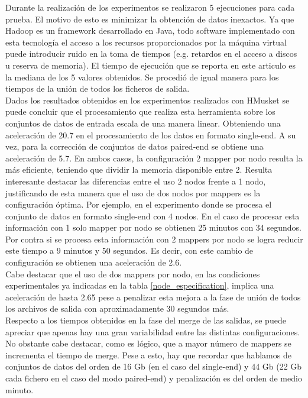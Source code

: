 \documentclass[conference]{IEEEtran}
\begin{document}
Durante la realización de los experimentos se realizaron 5 ejecuciones para cada prueba. El motivo de esto es minimizar la obtención de datos inexactos. Ya que Hadoop es un framework desarrollado en Java, todo software implementado con esta tecnología el acceso a los recursos proporcionados por la máquina virtual puede introducir ruido en la toma de tiempos (e.g. retardos en el acceso a discos u reserva de memoria). El tiempo de ejecución que se reporta en este articulo es la mediana de los 5 valores obtenidos. Se procedió de igual manera para los tiempos de la unión de todos los ficheros de salida.\\

Dados los resultados obtenidos en los experimentos realizados con HMusket se puede concluir que el procesamiento que realiza esta herramienta sobre los conjuntos de datos de entrada escala de una manera linear. Obteniendo una aceleración de 20.7 en el procesamiento de los datos en formato single-end. A su vez, para la corrección de conjuntos de datos paired-end se obtiene una aceleración de 5.7. En ambos casos, la configuración 2 mapper por nodo resulta la más eficiente, teniendo que dividir la memoria disponible entre 2. Resulta interesante destacar las diferencias entre el uso 2 nodos frente a 1 nodo, justificando de esta manera que el uso de dos nodos por mappers es la configuración óptima. Por ejemplo, en el experimento donde se procesa el conjunto de datos en formato single-end con 4 nodos. En el caso de procesar esta información con 1 solo mapper por nodo se obtienen 25 minutos con 34 segundos. Por contra si se procesa esta información con 2 mappers por nodo se logra reducir este tiempo a  9 minutos y 50 segundos. Es decir, con este cambio de configuración se obtienen una aceleración de 2.6.\\

Cabe destacar que el uso de dos mappers por nodo, en las condiciones experimentales ya indicadas en la tabla \ref{node_especification}, implica una aceleración de hasta 2.65 pese a penalizar esta mejora a la fase de unión de todos los archivos de salida con aproximadamente 30 segundos más.\\

Respecto a los tiempos obtenidos en la fase del merge de las salidas, se puede apreciar que apenas hay una gran variabilidad entre las distintas configuraciones. No obstante cabe destacar, como es lógico, que a mayor número de mappers se incrementa el tiempo de merge. Pese a esto, hay que recordar que hablamos de conjuntos de datos del orden de 16 Gb (en el caso del single-end) y 44 Gb (22 Gb cada fichero en el caso del modo paired-end) y penalización es del orden de medio minuto.
\end{document}
